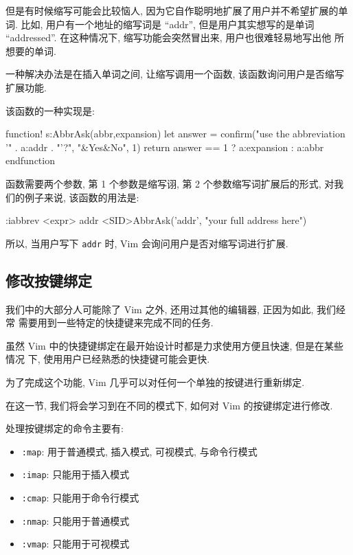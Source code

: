 但是有时候缩写可能会比较恼人, 因为它自作聪明地扩展了用户并不希望扩展的单词.
比如, 用户有一个地址的缩写词是 ``addr'', 但是用户其实想写的是单词
``addressed''. 在这种情况下, 缩写功能会突然冒出来, 用户也很难轻易地写出他
所想要的单词.

一种解决办法是在插入单词之间, 让缩写调用一个函数, 该函数询问用户是否缩写
扩展功能.

该函数的一种实现是:
\begin{vimscript}
function! s:AbbrAsk(abbr,expansion)
    let answer = confirm("use the abbreviation '" . a:addr . "'?",
        "&Yes\n&No", 1)
    return answer ==  1 ? a:expansion : a:abbr
endfunction
\end{vimscript}

函数需要两个参数, 第 1 个参数是缩写诩, 第 2 个参数缩写词扩展后的形式,
对我们的例子来说, 该函数的用法是:
\begin{vimcmd}
:iabbrev <expr> addr <SID>AbbrAsk('addr', "your full address here")
\end{vimcmd}

所以, 当用户写下 \texttt{addr} 时, Vim 会询问用户是否对缩写词进行扩展.

\subsection{修改按键绑定}
\label{subsec:modifying_key_bindings}

我们中的大部分人可能除了 Vim 之外, 还用过其他的编辑器, 正因为如此, 我们经常
需要用到一些特定的快捷键来完成不同的任务.

虽然 Vim 中的快捷键绑定在最开始设计时都是力求使用方便且快速, 但是在某些情况
下, 使用用户已经熟悉的快捷键可能会更快.

为了完成这个功能, Vim 几乎可以对任何一个单独的按键进行重新绑定.

在这一节, 我们将会学习到在不同的模式下, 如何对 Vim 的按键绑定进行修改.

处理按键绑定的命令主要有:
\begin{itemize}
    \item \texttt{:map}: 用于普通模式, 插入模式, 可视模式, 与命令行模式
    \item \texttt{:imap}: 只能用于插入模式
    \item \texttt{:cmap}: 只能用于命令行模式
    \item \texttt{:nmap}: 只能用于普通模式
    \item \texttt{:vmap}: 只能用于可视模式
\end{itemize}


